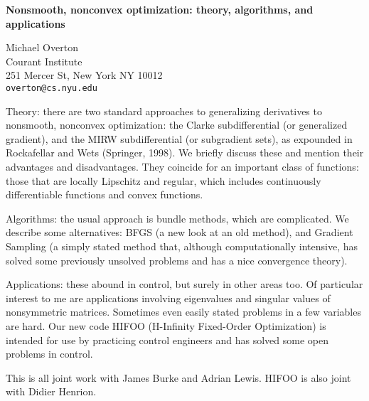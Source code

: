 \documentclass{report}
\begin{document}

\begin{center}
{\large
{\bf Nonsmooth, nonconvex optimization: theory, algorithms, and applications}}

	Michael Overton \\
	Courant Institute \\
	251 Mercer St, New York NY 10012 \\
	{\tt overton@cs.nyu.edu}
\end{center}
Theory: there are two standard approaches to generalizing
derivatives to nonsmooth, nonconvex optimization: the Clarke
subdifferential (or generalized gradient), and the MIRW
subdifferential (or subgradient sets), as expounded in
Rockafellar and Wets (Springer, 1998). We briefly discuss
these and mention their advantages and disadvantages. They
coincide for an important class of functions: those that are
locally Lipschitz and regular, which includes continuously
differentiable functions and convex functions.


Algorithms: the usual approach is bundle methods, which are
complicated. We describe some alternatives: BFGS (a new look
at an old method), and Gradient Sampling (a simply stated
method that, although computationally intensive, has solved
some previously unsolved problems and has a nice convergence
theory).

 Applications: these abound in control, but
surely in other areas too. Of particular interest to me are
applications involving eigenvalues and singular values of
nonsymmetric matrices. Sometimes even easily stated problems
in a few variables are hard. Our new code HIFOO (H-Infinity
Fixed-Order Optimization) is intended for use by practicing
control engineers and has solved some open problems in
control.

 This is all joint work with James Burke and
Adrian Lewis. HIFOO is also joint with Didier Henrion.



\end{document}
